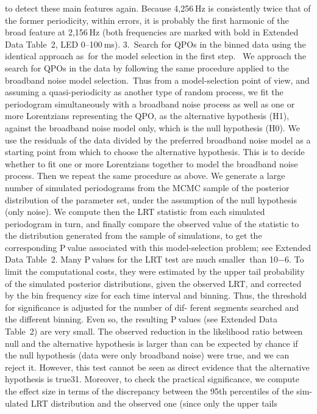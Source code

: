 to detect these main features again. Because 4,256 Hz is consistently
twice that of the former periodicity, within errors, it is probably the
first harmonic of the broad feature at 2,156 Hz (both frequencies are
marked with bold in Extended Data Table 2, LED 0–100 ms).
3. Search for QPOs in the binned data using the identical approach
as for the model selection in the first step.  We approach the search
for QPOs in the data by following the same procedure applied to the
broadband noise model selection. Thus from a model-selection point
of view, and assuming a quasi-periodicity as another type of random
process, we fit the periodogram simultaneously with a broadband noise
process as well as one or more Lorentzians representing the QPO, as
the alternative hypothesis (H1), against the broadband noise model
only, which is the null hypothesis (H0).
We use the residuals of the data divided by the preferred broadband
noise model as a starting point from which to choose the alternative
hypothesis. This is to decide whether to fit one or more Lorentzians
together to model the broadband noise process.
Then we repeat the same procedure as above. We generate a large
number of simulated periodograms from the MCMC sample of the
posterior distribution of the parameter set, under the assumption of
the null hypothesis (only noise). We compute then the LRT statistic
from each simulated periodogram in turn, and finally compare the
observed value of the statistic to the distribution generated from the
sample of simulations, to get the corresponding P value associated with
this model-selection problem; see Extended Data Table 2.
Many P values for the LRT test are much smaller than 10−6. To limit the
computational costs, they were estimated by the upper tail probability
of the simulated posterior distributions, given the observed LRT, and
corrected by the bin frequency size for each time interval and binning.
Thus, the threshold for significance is adjusted for the number of dif-
ferent segments searched and the different binning.
Even so, the resulting P values (see Extended Data Table 2) are very
small. The observed reduction in the likelihood ratio between null and
the alternative hypothesis is larger than can be expected by chance if
the null hypothesis (data were only broadband noise) were true, and
we can reject it. However, this test cannot be seen as direct evidence
that the alternative hypothesis is true31.
Moreover, to check the practical significance, we compute the effect
size in terms of the discrepancy between the 95th percentiles of the sim-
ulated LRT distribution and the observed one (since only the upper tails
